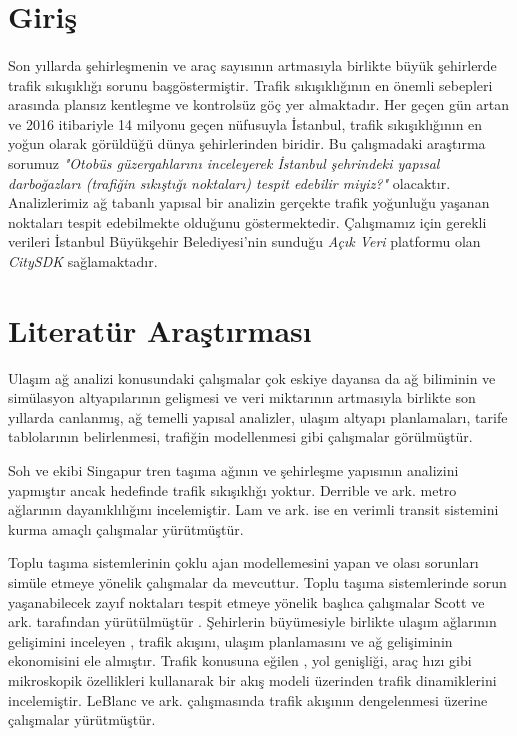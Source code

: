 \documentclass[10pt,a4paper,twocolumn]{article}
\begin{document}
\section{Giriş}
\paragraph{} Son yıllarda şehirleşmenin ve araç sayısının artmasıyla birlikte büyük şehirlerde trafik sıkışıklığı sorunu başgöstermiştir. Trafik sıkışıklığının en önemli sebepleri arasında plansız kentleşme ve kontrolsüz göç yer almaktadır. Her geçen gün artan ve 2016 itibariyle 14 milyonu geçen nüfusuyla İstanbul, trafik sıkışıklığının en yoğun olarak görüldüğü dünya şehirlerinden biridir. Bu çalışmadaki araştırma sorumuz \textit{"Otobüs güzergahlarını inceleyerek İstanbul şehrindeki yapısal darboğazları (trafiğin sıkıştığı noktaları) tespit edebilir miyiz?"} olacaktır. Analizlerimiz ağ tabanlı yapısal bir analizin gerçekte trafik yoğunluğu yaşanan noktaları tespit edebilmekte olduğunu göstermektedir. Çalışmamız için gerekli verileri İstanbul Büyükşehir Belediyesi'nin sunduğu \textit{Açık Veri} platformu olan \textit{CitySDK} sağlamaktadır. 

\section{Literatür Araştırması}
Ulaşım ağ analizi konusundaki çalışmalar \cite{lam1982connectivity,bell1997transportation} çok eskiye dayansa da ağ biliminin ve simülasyon altyapılarının gelişmesi ve veri miktarının artmasıyla birlikte son yıllarda canlanmış, ağ temelli yapısal analizler, ulaşım altyapı planlamaları, tarife tablolarının belirlenmesi, trafiğin modellenmesi gibi çalışmalar görülmüştür.

Soh ve ekibi Singapur tren taşıma ağının ve şehirleşme yapısının analizini yapmıştır \cite{soh2010weighted} ancak hedefinde trafik sıkışıklığı yoktur. Derrible ve ark. metro ağlarının dayanıklılığını \cite{derrible2010complexity} incelemiştir. Lam ve ark. ise en verimli transit sistemini kurma amaçlı çalışmalar \cite{lam1982connectivity} yürütmüştür.

Toplu taşıma sistemlerinin çoklu ajan modellemesini yapan ve olası sorunları simüle etmeye yönelik çalışmalar da \cite{balbo2001toward,von2007network,von2009public,levinson2006self} mevcuttur. Toplu taşıma sistemlerinde sorun yaşanabilecek zayıf noktaları tespit etmeye yönelik başlıca çalışmalar Scott ve ark.  tarafından yürütülmüştür \cite{scott2006network}. Şehirlerin büyümesiyle birlikte ulaşım ağlarının gelişimini inceleyen \cite{xie2009modeling}, trafik akışını, ulaşım planlamasını ve ağ gelişiminin ekonomisini ele almıştır. Trafik konusuna eğilen \cite{sun2008dynamics}, yol genişliği, araç hızı gibi mikroskopik özellikleri kullanarak bir akış modeli üzerinden trafik dinamiklerini incelemiştir. LeBlanc ve ark. çalışmasında trafik akışının dengelenmesi üzerine çalışmalar \cite{leblanc1975efficient} yürütmüştür. 
\end{document}
